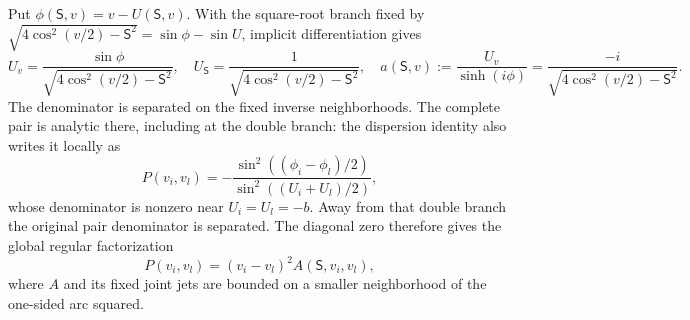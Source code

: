\documentclass[11pt]{article}
\numberwithin{equation}{section}
\theoremstyle{definition}
\begin{document}
Put $\phi(\mathsf S,v)=v-U(\mathsf S,v)$.  With the square-root
branch fixed by $\sqrt{4\cos^2(v/2)-\mathsf S^2}=\sin\phi-\sin U$,
implicit differentiation gives
\begin{equation}\label{eq:iso-regular-factors}
 U_v=\frac{\sin\phi}{\sqrt{4\cos^2(v/2)-\mathsf S^2}},\quad
 U_{\mathsf S}=\frac1{\sqrt{4\cos^2(v/2)-\mathsf S^2}},\quad
 a(\mathsf S,v):=\frac{U_v}{\sinh(i\phi)}
     =\frac{-i}{\sqrt{4\cos^2(v/2)-\mathsf S^2}}.
\end{equation}
The denominator is separated on the fixed inverse neighborhoods.
The complete pair is analytic there, including at the double branch:
the dispersion identity also writes it locally as
\[
 P(v_i,v_l)=-\frac{\sin^2((\phi_i-\phi_l)/2)}
                         {\sin^2((U_i+U_l)/2)},
\]
whose denominator is nonzero near $U_i=U_l=-b$.
Away from that double branch the original pair denominator is
separated.  The diagonal zero therefore gives the global regular
factorization
\begin{equation}\label{eq:iso-pair-zero}
 P(v_i,v_l)=(v_i-v_l)^2 A(\mathsf S,v_i,v_l),
\end{equation}
where $A$ and its fixed joint jets are bounded on a smaller
neighborhood of the one-sided arc squared.
\end{document}
